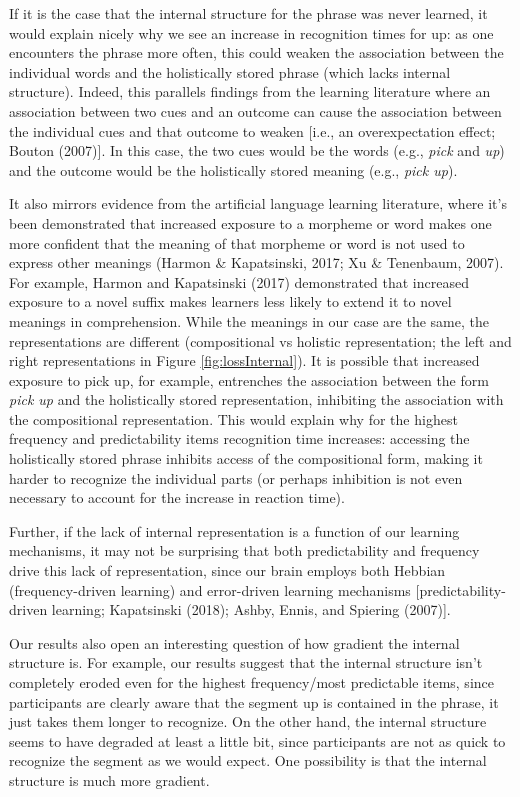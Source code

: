 \documentclass[
  man,floatsintext]{apa6}
\begin{document}
If it is the case that the internal structure for the phrase was never learned, it would explain nicely why we see an increase in recognition times for up: as one encounters the phrase more often, this could weaken the association between the individual words and the holistically stored phrase (which lacks internal structure). Indeed, this parallels findings from the learning literature where an association between two cues and an outcome can cause the association between the individual cues and that outcome to weaken {[}i.e., an overexpectation effect; Bouton (2007){]}. In this case, the two cues would be the words (e.g., \emph{pick} and \emph{up}) and the outcome would be the holistically stored meaning (e.g., \emph{pick up}).

It also mirrors evidence from the artificial language learning literature, where it's been demonstrated that increased exposure to a morpheme or word makes one more confident that the meaning of that morpheme or word is not used to express other meanings (Harmon \& Kapatsinski, 2017; Xu \& Tenenbaum, 2007). For example, Harmon and Kapatsinski (2017) demonstrated that increased exposure to a novel suffix makes learners less likely to extend it to novel meanings in comprehension. While the meanings in our case are the same, the representations are different (compositional vs holistic representation; the left and right representations in Figure \ref{fig:lossInternal}). It is possible that increased exposure to pick up, for example, entrenches the association between the form \emph{pick up} and the holistically stored representation, inhibiting the association with the compositional representation. This would explain why for the highest frequency and predictability items recognition time increases: accessing the holistically stored phrase inhibits access of the compositional form, making it harder to recognize the individual parts (or perhaps inhibition is not even necessary to account for the increase in reaction time).

Further, if the lack of internal representation is a function of our learning mechanisms, it may not be surprising that both predictability and frequency drive this lack of representation, since our brain employs both Hebbian (frequency-driven learning) and error-driven learning mechanisms {[}predictability-driven learning; Kapatsinski (2018); Ashby, Ennis, and Spiering (2007){]}.

Our results also open an interesting question of how gradient the internal structure is. For example, our results suggest that the internal structure isn't completely eroded even for the highest frequency/most predictable items, since participants are clearly aware that the segment up is contained in the phrase, it just takes them longer to recognize. On the other hand, the internal structure seems to have degraded at least a little bit, since participants are not as quick to recognize the segment as we would expect. One possibility is that the internal structure is much more gradient.
\end{document}
